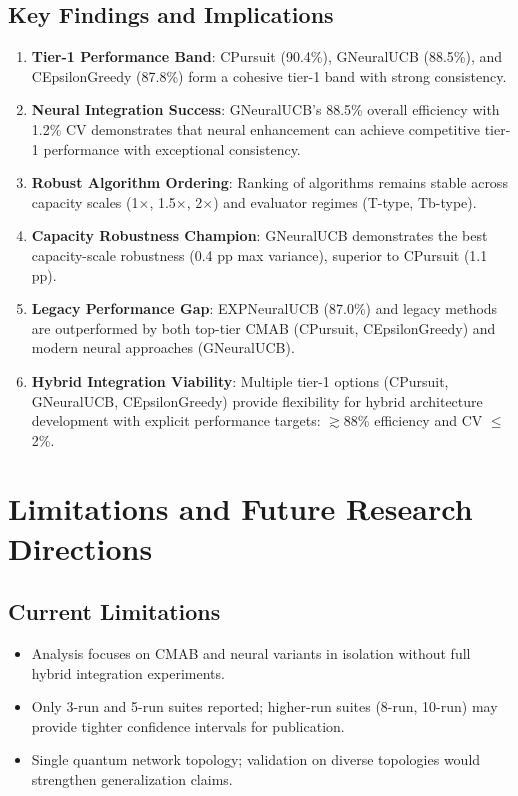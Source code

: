 \documentclass[12pt,a4paper]{article}
\newcommand{\legacy}[1]{\textcolor{legacycolor}{\textbf{#1}}}
\newcommand{\neural}[1]{\textcolor{neuralcolor}{\textbf{#1}}}
\begin{document}
\subsection{Key Findings and Implications}

\begin{enumerate}
\item \textbf{Tier-1 Performance Band}: CPursuit (90.4\%), GNeuralUCB (88.5\%), and CEpsilonGreedy (87.8\%) form a cohesive tier-1 band with strong consistency.
\item \neural{Neural Integration Success}: GNeuralUCB's 88.5\% overall efficiency with 1.2\% CV demonstrates that neural enhancement can achieve competitive tier-1 performance with exceptional consistency.
\item \textbf{Robust Algorithm Ordering}: Ranking of algorithms remains stable across capacity scales (1$\times$, 1.5$\times$, 2$\times$) and evaluator regimes (T-type, Tb-type).
\item \neural{Capacity Robustness Champion}: GNeuralUCB demonstrates the best capacity-scale robustness (0.4 pp max variance), superior to CPursuit (1.1 pp).
\item \legacy{Legacy Performance Gap}: EXPNeuralUCB (87.0\%) and legacy methods are outperformed by both top-tier CMAB (CPursuit, CEpsilonGreedy) and modern neural approaches (GNeuralUCB).
\item \textbf{Hybrid Integration Viability}: Multiple tier-1 options (CPursuit, GNeuralUCB, CEpsilonGreedy) provide flexibility for hybrid architecture development with explicit performance targets: $\gtrsim$88\% efficiency and CV $\leq$2\%.
\end{enumerate}

\section{Limitations and Future Research Directions}

\subsection{Current Limitations}

\begin{itemize}
\item Analysis focuses on CMAB and neural variants in isolation without full hybrid integration experiments.
\item Only 3-run and 5-run suites reported; higher-run suites (8-run, 10-run) may provide tighter confidence intervals for publication.
\item Single quantum network topology; validation on diverse topologies would strengthen generalization claims.
\end{itemize}
\end{document}
